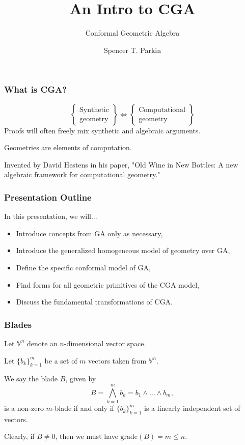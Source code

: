 \documentclass{beamer}
\title{An Intro to CGA}
\subtitle{Conformal Geometric Algebra}
\author{Spencer T. Parkin}
\institute{Avalanche Software}
\newcommand{\V}{\mathbb{V}}
\newcommand{\grade}{\mbox{grade}}
\begin{document}
\frame{\titlepage}

\begin{frame}
\frametitle{What is CGA?}
\begin{equation*}
\left\{\begin{array}{c}
\mbox{Synthetic} \\
\mbox{geometry}
\end{array}\right\}
\Longleftrightarrow
\left\{\begin{array}{c}
\mbox{Computational} \\
\mbox{geometry}
\end{array}\right\}
\end{equation*}\pause
Proofs will often freely mix synthetic and algebraic arguments.\pause

Geometries are elements of computation.\pause

Invented by \alert{David Hestens} in his paper, "Old Wine in New Bottles:
A new algebraic framework for computational geometry."
\end{frame}

\begin{frame}
\frametitle{Presentation Outline}
In this presentation, we will...\pause
\begin{itemize}
\item Introduce concepts from GA only as necessary,\pause
\item Introduce the generalized homogeneous model of geometry over GA,\pause
\item Define the specific conformal model of GA,\pause
\item Find forms for all geometric primitives of the CGA model,\pause
\item Discuss the fundamental transformations of CGA.
\end{itemize}
\end{frame}

\begin{frame}
\frametitle{Blades}
Let $\V^n$ denote an $n$-dimensional vector space.\pause

Let $\{b_k\}_{k=1}^m$ be a set of $m$ vectors taken from $\V^n$.\pause
\begin{definition}
We say the blade $B$, given by
\begin{equation*}
B = \bigwedge_{k=1}^m b_k = b_1\wedge\dots\wedge b_m,
\end{equation*}
is a non-zero $m$-blade if and only if $\{b_k\}_{k=1}^m$
is a linearly independent set of vectors.
\end{definition}\pause
Clearly, if $B\neq 0$, then we must have $\grade(B)=m\leq n$.
\end{frame}
\end{document}
